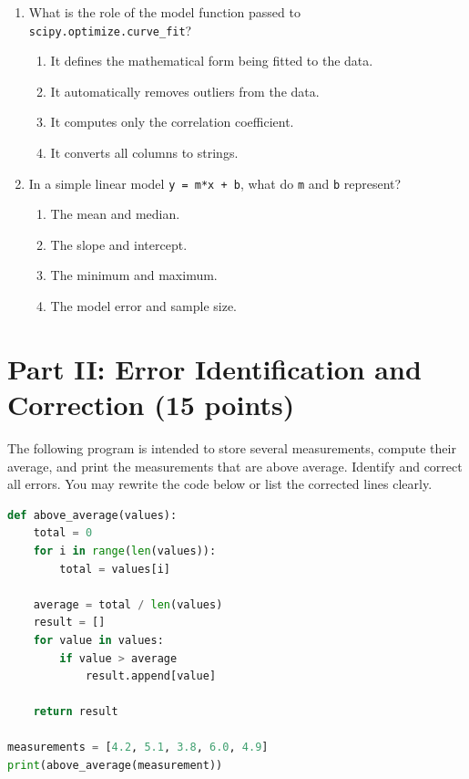 \documentclass[12pt]{article}
\begin{document}
\begin{enumerate}[label=\arabic*.]
\item What is the role of the model function passed to \texttt{scipy.optimize.curve\_fit}?
\begin{enumerate}[label=\Alph*.]
\item It defines the mathematical form being fitted to the data.
\item It automatically removes outliers from the data.
\item It computes only the correlation coefficient.
\item It converts all columns to strings.
\end{enumerate}

\item In a simple linear model \texttt{y = m*x + b}, what do \texttt{m} and \texttt{b} represent?
\begin{enumerate}[label=\Alph*.]
\item The mean and median.
\item The slope and intercept.
\item The minimum and maximum.
\item The model error and sample size.
\end{enumerate}

\end{enumerate}

\newpage
\section*{Part II: Error Identification and Correction (15 points)}

The following program is intended to store several measurements, compute their average, and print the measurements that are above average. Identify and correct all errors. You may rewrite the code below or list the corrected lines clearly.

\begin{lstlisting}[language=Python]
def above_average(values):
    total = 0
    for i in range(len(values)):
        total = values[i]

    average = total / len(values)
    result = []
    for value in values:
        if value > average
            result.append[value]

    return result

measurements = [4.2, 5.1, 3.8, 6.0, 4.9]
print(above_average(measurement))
\end{lstlisting}

\vspace{3.8in}
\end{document}
